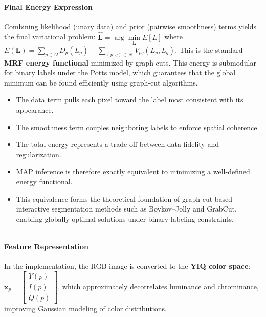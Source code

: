 \documentclass[11pt]{article}
\providecommand{\tightlist}{%
      \setlength{\itemsep}{0pt}\setlength{\parskip}{0pt}}
\begin{document}
\hypertarget{final-energy-expression}{%
\paragraph{\texorpdfstring{\textbf{Final Energy
Expression}}{Final Energy Expression}}\label{final-energy-expression}}

Combining likelihood (unary data) and prior (pairwise smoothness) terms
yields the final variational problem:
\(\boxed{ \hat{\mathbf{L}} = \arg\underset{\mathbf{L}}{\min}E[L]}\)
where
\(\boxed{E(\mathbf{L}) = \sum\limits_{p\in\Omega} D_p(L_p) + \sum\limits_{(p,q)\in\mathcal{N}} V_{pq}(L_p,L_q)}\).
This is the standard \textbf{MRF energy functional} minimized by graph
cuts. This energy is submodular for binary labels under the Potts model,
which guarantees that the global minimum can be found efficiently using
graph-cut algorithms.

\begin{itemize}
\tightlist
\item
  The data term pulls each pixel toward the label most consistent with
  its appearance.
\item
  The smoothness term couples neighboring labels to enforce spatial
  coherence.
\item
  The total energy represents a trade-off between data fidelity and
  regularization.
\item
  MAP inference is therefore exactly equivalent to minimizing a
  well-defined energy functional.
\item
  This equivalence forms the theoretical foundation of graph-cut-based
  interactive segmentation methods such as Boykov--Jolly and GrabCut,
  enabling globally optimal solutions under binary labeling constraints.
\end{itemize}

\begin{center}\rule{0.5\linewidth}{0.5pt}\end{center}

\hypertarget{feature-representation}{%
\paragraph{\texorpdfstring{\textbf{Feature
Representation}}{Feature Representation}}\label{feature-representation}}

In the implementation, the RGB image is converted to the \textbf{YIQ
color space}:
\(\mathbf{x}_p = \begin{bmatrix} Y(p) \\ I(p) \\ Q(p) \end{bmatrix}\),
which approximately decorrelates luminance and chrominance, improving
Gaussian modeling of color distributions.
\end{document}
